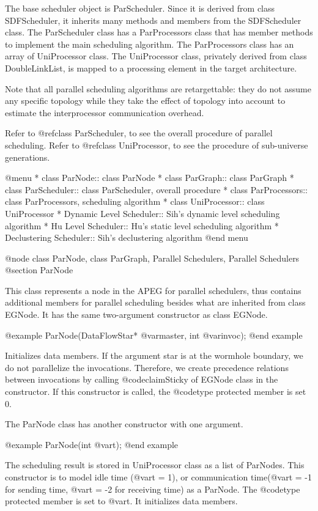 The base scheduler object is ParScheduler. Since it is derived from class
SDFScheduler, it inherits many methods and members from the SDFScheduler
class. The ParScheduler class has a ParProcessors class that has
member methods to implement the main scheduling algorithm. The ParProcessors
class has an array of UniProcessor class. The UniProcessor class,
privately derived from class DoubleLinkList, is mapped to a
processing element in the target architecture.

Note that all parallel scheduling algorithms are retargettable:
they do not assume any specific topology while they take the effect
of topology into account to estimate the interprocessor communication
overhead. 

Refer to @ref{class ParScheduler}, to see the overall procedure of parallel
scheduling. Refer to @ref{class UniProcessor}, to see the procedure of
sub-universe generations.

@menu
* class ParNode::		class ParNode
* class ParGraph::		class ParGraph
* class ParScheduler::		class ParScheduler, overall procedure
* class ParProcessors::		class ParProcessors, scheduling algorithm
* class UniProcessor::		class UniProcessor
* Dynamic Level Scheduler::	Sih's dynamic level scheduling algorithm
* Hu Level Scheduler::		Hu's static level scheduling algorithm
* Declustering Scheduler::	Sih's declustering algorithm
@end menu

@node class ParNode, class ParGraph, Parallel Schedulers, Parallel Schedulers
@section ParNode

This class represents a node in the APEG for parallel schedulers, thus 
contains additional members for parallel scheduling besides what are
inherited from class EGNode. It has the same two-argument 
constructor as class EGNode.

@example
ParNode(DataFlowStar* @var{master}, int @var{invoc});
@end example

Initializes data members. If the argument star is at the wormhole
boundary, we do not parallelize the invocations. Therefore, we create
precedence relations between invocations by calling @code{claimSticky}
of EGNode class in the constructor. If this constructor is called,
the @code{type} protected member is set 0.

The ParNode class has another constructor with one argument.

@example
ParNode(int @var{t});
@end example

The scheduling result is stored in UniProcessor class as a list of
ParNodes. This constructor is to model idle time (@var{t} = 1), or
communication time(@var{t} = -1 for sending time, @var{t} = -2
for receiving time) as a ParNode. The @code{type} protected member
is set to @var{t}. It initializes data members.

